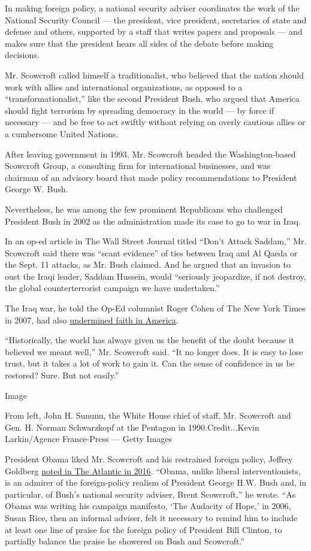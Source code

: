 In making foreign policy, a national security adviser coordinates the
work of the National Security Council --- the president, vice president,
secretaries of state and defense and others, supported by a staff that
writes papers and proposals --- and makes sure that the president hears
all sides of the debate before making decisions.

Mr. Scowcroft called himself a traditionalist, who believed that the
nation should work with allies and international organizations, as
opposed to a ``transformationalist,'' like the second President Bush,
who argued that America should fight terrorism by spreading democracy in
the world --- by force if necessary --- and be free to act swiftly
without relying on overly cautious allies or a cumbersome United
Nations.

After leaving government in 1993, Mr. Scowcroft headed the
Washington-based Scowcroft Group, a consulting firm for international
businesses, and was chairman of an advisory board that made policy
recommendations to President George W. Bush.

Nevertheless, he was among the few prominent Republicans who challenged
President Bush in 2002 as the administration made its case to go to war
in Iraq.

In an op-ed article in The Wall Street Journal titled ``Don't Attack
Saddam,'' Mr. Scowcroft said there was ``scant evidence'' of ties
between Iraq and Al Qaeda or the Sept. 11 attacks, as Mr. Bush claimed.
And he argued that an invasion to oust the Iraqi leader, Saddam Hussein,
would ``seriously jeopardize, if not destroy, the global
counterterrorist campaign we have undertaken.''

The Iraq war, he told the Op-Ed columnist Roger Cohen of The New York
Times in 2007, had also
\href{https://www.nytimes.com/2007/09/03/opinion/03cohen.html}{undermined
faith in America}.

``Historically, the world has always given us the benefit of the doubt
because it believed we meant well,'' Mr. Scowcroft said. ``It no longer
does. It is easy to lose trust, but it takes a lot of work to gain it.
Can the sense of confidence in us be restored? Sure. But not easily.''

Image

From left, John H. Sununu, the White House chief of staff, Mr. Scowcroft
and Gen. H. Norman Schwarzkopf at the Pentagon in 1990.Credit...Kevin
Larkin/Agence France-Press --- Getty Images

President Obama liked Mr. Scowcroft and his restrained foreign policy,
Jeffrey Goldberg
\href{https://www.theatlantic.com/magazine/archive/2016/04/the-obama-doctrine/471525/}{noted
in The Atlantic in 2016}. ``Obama, unlike liberal interventionists, is
an admirer of the foreign-policy realism of President George H.W. Bush
and, in particular, of Bush's national security adviser, Brent
Scowcroft,'' he wrote. ``As Obama was writing his campaign manifesto,
`The Audacity of Hope,' in 2006, Susan Rice, then an informal adviser,
felt it necessary to remind him to include at least one line of praise
for the foreign policy of President Bill Clinton, to partially balance
the praise he showered on Bush and Scowcroft.''

